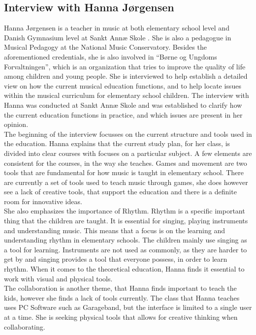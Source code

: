 \subsection{Interview with Hanna Jørgensen} \label{ProblemArea} 
Hanna Jørgensen is a teacher in music at both elementary school level and Danish Gymnasium level at Sankt Annæ Skole . She is also a pedagogue in Musical Pedagogy at the National Music Conservatory. Besides the aforementioned credentials, she is also involved in “Børne og Ungdoms Forvaltningen”, which is an organization that tries to improve the quality of life among children and young people. She is interviewed to help establish a detailed view on how the current musical education functions, and to help locate issues within the musical curriculum for elementary school children.
The interview with Hanna was conducted at Sankt Annæ Skole and was established to clarify how the current education functions in practice, and which issues are present in her opinion.\\ 

The beginning of the interview focusses on the current structure and tools used in the education. Hanna explains that the current study plan, for her class, is divided into clear courses with focuses on a particular subject. A few elements are consistent for the courses, in the way she teaches. Games and movement are two tools that are fundamental for how music is taught in elementary school. There are currently a set of tools used to teach music through games, she does however see a lack of creative tools, that support the education and there is a definite room for innovative ideas.\\

She also emphasizes the importance of Rhythm. Rhythm is a specific important thing that the children are taught. It is essential for singing, playing instruments and understanding music. This means that a focus is on the learning and understanding rhythm in elementary schools. The children mainly use singing as a tool for learning. Instruments are not used as commonly, as they are harder to get by and singing provides a tool that everyone possess, in order to learn rhythm. When it comes to the theoretical education, Hanna finds it essential to work with visual and physical tools. \\

The collaboration is another theme, that Hanna finds important to teach the kids, however she finds a lack of tools currently. The class that Hanna teaches uses PC Software such as Garageband, but the interface is limited to a single user at a time. She is seeking physical tools that allows for creative thinking when collaborating. \\

